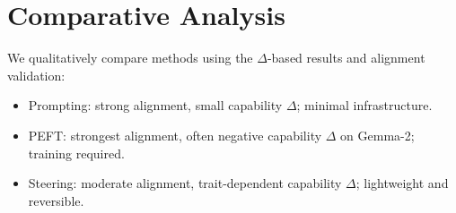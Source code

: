 \section{Comparative Analysis}
\label{app:comparative-analysis}

We qualitatively compare methods using the \(\Delta\)-based results and alignment validation:
\begin{itemize}
\item Prompting: strong alignment, small capability \(\Delta\); minimal infrastructure.
\item PEFT: strongest alignment, often negative capability \(\Delta\) on Gemma-2; training required.
\item Steering: moderate alignment, trait-dependent capability \(\Delta\); lightweight and reversible.
\end{itemize}
